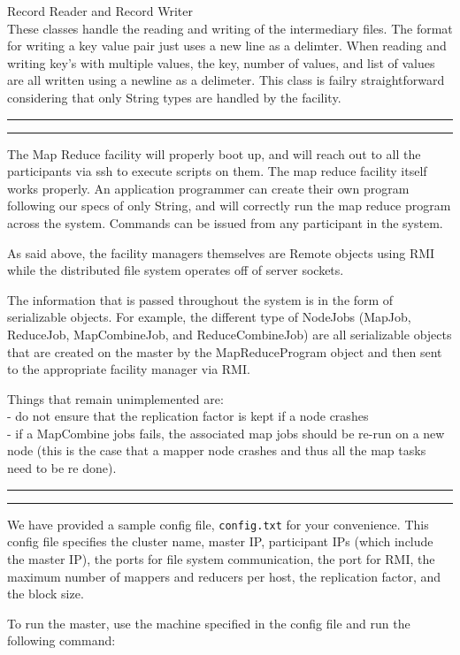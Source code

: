 \documentclass[11pt]{article}
\newcommand{\question}[2] {\vspace{.25in} \hrule\vspace{0.5em}
\noindent{\bf #1: #2} \vspace{0.5em}
\hrule \vspace{.10in}}
\begin{document}
Record Reader and Record Writer
\\ These classes handle the reading and writing of the intermediary files. The format for writing a key value pair just uses a new line as a delimter. When reading and writing key's with multiple values, the key, number of values, and list of values are all written using a newline as a delimeter. This class is failry straightforward considering that only String types are handled by the facility.

\question{II} {Implementation}
The Map Reduce facility will properly boot up, and will reach out to all the participants via ssh to execute scripts on them. The map reduce facility itself works properly. An application programmer can create their own program following our specs of only String, and will correctly run the map reduce program across the system. Commands can be issued from any participant in the system.

As said above, the facility managers themselves are Remote objects using RMI while the distributed file system operates off of server sockets.

The information that is passed throughout the system is in the form of serializable objects. For example, the different type of NodeJobs (MapJob, ReduceJob, MapCombineJob, and ReduceCombineJob) are all serializable objects that are created on the master by the MapReduceProgram object and then sent to the appropriate facility manager via RMI.

Things that remain unimplemented are:
\\ - do not ensure that the replication factor is kept if a node crashes
\\ - if a MapCombine jobs fails, the associated map jobs should be re-run on a new node (this is the case that a mapper node crashes and thus all the map tasks need to be re done). 

\question{III} {Build, Deploy, and Run}

We have provided a sample config file, \texttt{config.txt} for your convenience. This config file specifies the cluster name, master IP, participant IPs (which include the master IP), the ports for file system communication, the port for RMI, the maximum number of mappers and reducers per host, the replication factor, and the block size.

To run the master, use the machine specified in the config file and run the following command:
\end{document}
